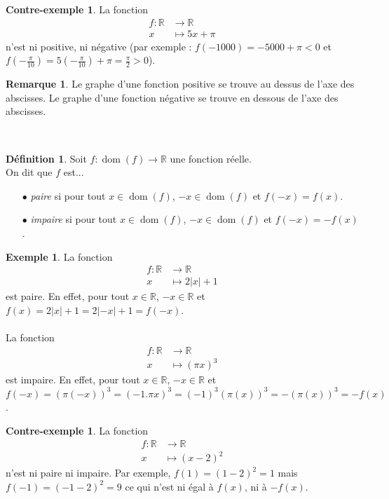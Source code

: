 \documentclass[a4paper,13pt]{scrreprt}
\theoremstyle{plain}
\theoremstyle{definition}
\newtheorem{déf}[subsection]{Définition}
\newtheorem{exe}[subsection]{Exemple}
\newtheorem{con}[subsection]{Contre-exemple}
\newtheorem{rema}[subsection]{Remarque}
\newcommand{\rr}{\mathbb{R}}
\DeclareMathOperator{\dom}{dom}
\begin{document}
\begin{con}
	La fonction \begin{align*}
	f : \rr &\to \rr \\
	x &\mapsto 5x+\pi
	\end{align*}
	n'est ni positive, ni négative (par exemple : $f(-1000)=-5000+\pi < 0$ et $f(-\frac{\pi}{10})=5(-\frac{\pi}{10})+\pi=\frac{\pi}{2}>0$).
\end{con}

\begin{rema}
	Le graphe d'une fonction positive se trouve au dessus de l'axe des abscisses. Le graphe d'une fonction négative se trouve en dessous de l'axe des abscisses.
\end{rema}
~~\\
\begin{déf}
	Soit $f : \dom(f) \to \rr$ une fonction réelle. \\
	On dit que $f$ est...
	\begin{itemize}
		\item [$\bullet$] \emph{paire} si pour tout $x \in \dom(f)$, $-x \in \dom(f)$ et $f(-x) = f(x)$.
		\item [$\bullet$] \emph{impaire} si pour tout $x \in \dom(f)$, $-x \in \dom(f)$ et $f(-x) =- f(x)$.
	\end{itemize}
\end{déf}

\begin{exe}
	La fonction \begin{align*}
	f : \rr &\to \rr \\
	x &\mapsto 2|x|+1
	\end{align*}
	est paire. En effet, pour tout $x \in \rr$, $-x \in \rr$ et $f(x)=2|x|+1=2|-x|+1=f(-x)$. \\
	~~\\
	La fonction \begin{align*}
	f : {\rr} &\to \rr \\
	x &\mapsto (\pi x)^3
	\end{align*}
	est impaire. En effet, pour tout $x \in \rr$, $-x \in \rr$ et $f(-x)=(\pi (-x))^3=(-1.\pi x)^3= (-1)^3(\pi (x))^3=-(\pi (x))^3=-f(x)$.
\end{exe}

\begin{con}
	La fonction \begin{align*}
	f : \rr &\to \rr \\
	x &\mapsto (x-2)^2
	\end{align*}
	n'est ni paire ni impaire. Par exemple, $f(1)=(1-2)^2=1$ mais $f(-1)=(-1-2)^2=9$ ce qui n'est ni égal à $f(x)$, ni à $-f(x)$.
\end{con}
\end{document}
